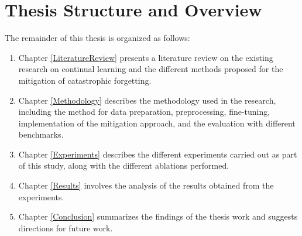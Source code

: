 
\section{Thesis Structure and Overview}
The remainder of this thesis is organized as follows:
\begin{enumerate}
    \item Chapter \ref{LiteratureReview} presents a literature review on the existing research on continual learning and the different methods proposed for the mitigation of catastrophic forgetting.
    \item Chapter \ref{Methodology} describes the methodology used in the research, including the method for data preparation, preprocessing, fine-tuning, implementation of the mitigation approach, and the evaluation with different benchmarks.
    \item Chapter \ref{Experiments} describes the different experiments carried out as part of this study, along with the different ablations performed.
    \item Chapter \ref{Results} involves the analysis of the results obtained from the experiments.
    \item Chapter \ref{Conclusion} summarizes the findings of the thesis work and suggests directions for future work.

\end{enumerate}
